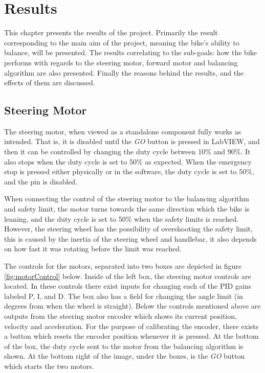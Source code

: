 \chapter{Results}\label{results}

This chapter presents the results of the project. Primarily the result corresponding to the main aim of the project, meaning the bike's ability to balance, will be presented. The results correlating to the sub-goals: how the bike performs with regards to the steering motor, forward motor and balancing algorithm are also presented. Finally the reasons behind the results, and the effects of them are discussed.

\section{Steering Motor}

The steering motor, when viewed as a standalone component fully works as intended. That is, it is disabled until the \textit{GO} button is pressed in LabVIEW, and then it can be controlled by changing the duty cycle between 10\% and 90\%. It also stops when the duty cycle is set to 50\% as expected. When the emergency stop is pressed either physically or in the software, the duty cycle is set to 50\%, and the pin is disabled. 

When connecting the control of the steering motor to the balancing algorithm and safety limit, the motor turns towards the same direction which the bike is leaning, and the duty cycle is set to 50\% when the safety limits is reached. However, the steering wheel has the possibility of overshooting the safety limit, this is caused by the inertia of the steering wheel and handlebar, it also depends on how fast it was rotating before the limit was reached.

The controls for the motors, separated into two boxes are depicted in figure \ref{fig:motorControl} below. Inside of the left box, the steering motor controls are located. In these controls there exist inputs for changing each of the PID gains labeled P, I, and D. The box also has a field for changing the angle limit (in degrees from when the wheel is straight). Below the controls mentioned above are outputs from the steering motor encoder which shows its current position, velocity and acceleration. For the purpose of calibrating the encoder, there exists a button which resets the encoder position whenever it is pressed. At the bottom of the box, the duty cycle sent to the motor from the balancing algorithm is shown. At the bottom right of the image, under the boxes, is the \textit{GO} button which starts the two motors.

